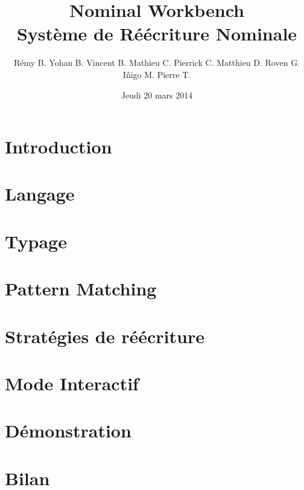 \documentclass[xcolor=dvipsnames]{beamer}
\title[Nominal Workbench]{Nominal Workbench\\Système de Réécriture Nominale}
\author[\'Equipe NoWork]{Rémy B. Yohan B. Vincent B. Mathieu C. Pierrick C. Matthieu D. Roven G. I\~nigo M. Pierre T.}
\institute[UPMC]{Université Pierre et Marie Curie}
\date{Jeudi 20 mars 2014}
\begin{document}
\begin{frame}
\titlepage
\end{frame}


\section{Introduction}


\section{Langage}


\section{Typage}


\section{Pattern Matching}


\section{Stratégies de réécriture}


\section{Mode Interactif}


\section{Démonstration}




\section{Bilan}

\end{document}
